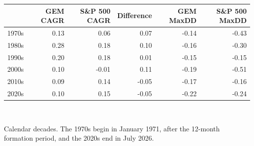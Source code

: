 \small
\begin{tabular}{lrrrrr}
\toprule
  & \textbf{GEM CAGR} & \textbf{S\&P 500 CAGR} & \textbf{Difference} & \textbf{GEM MaxDD} & \textbf{S\&P 500 MaxDD} \\
\midrule
1970s & 0.13 & 0.06 & 0.07 & -0.14 & -0.43 \\
1980s & 0.28 & 0.18 & 0.10 & -0.16 & -0.30 \\
1990s & 0.20 & 0.18 & 0.01 & -0.15 & -0.15 \\
2000s & 0.10 & -0.01 & 0.11 & -0.19 & -0.51 \\
2010s & 0.09 & 0.14 & -0.05 & -0.17 & -0.16 \\
2020s & 0.10 & 0.15 & -0.05 & -0.22 & -0.24 \\
\bottomrule
\end{tabular}
\\[0.4em]
\begin{minipage}{\linewidth}\footnotesize Calendar decades. The 1970s begin in January 1971, after the 12-month formation period, and the 2020s end in July 2026.\end{minipage}
